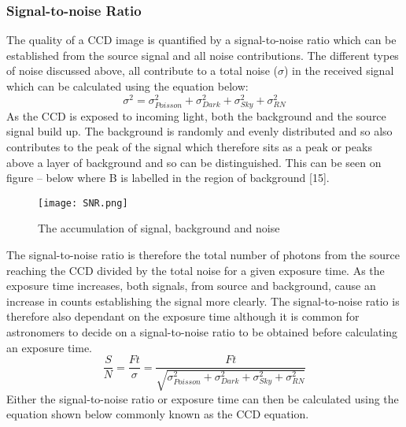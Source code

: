\documentclass[pdf,color]{UoBnote}
\begin{document}
\subsubsection{Signal-to-noise Ratio}
The quality of a CCD image is quantified by a signal-to-noise ratio which can be established from the source signal and all noise contributions. The different types of noise discussed above, all contribute to a total noise ($\sigma$) in the received signal which can be calculated using the equation below:\\
\begin{equation}
\sigma^{2} = \sigma_{Poisson}^{2} + \sigma_{Dark}^{2} + \sigma_{Sky}^{2} + \sigma_{RN}^{2}
\end{equation}
\newline
 As the CCD is exposed to incoming light, both the background and the source signal build up. The background is randomly and evenly distributed and so also contributes to the peak of the signal which therefore sits as a peak or peaks above a layer of background and so can be distinguished. This can be seen on figure – below where B is labelled in the region of background [15]. \\
\newline
\begin{figure}[H]
\begin{center}
\texttt{[image: SNR.png]}
\end{center}
\caption{The accumulation of signal, background and noise}\label{fig:figure1}
\end{figure}
\noindent
\newline
The signal-to-noise ratio is therefore the total number of photons from the source reaching the CCD divided by the total noise for a given exposure time. As the exposure time increases, both signals, from source and background, cause an increase in counts establishing the signal more clearly. The signal-to-noise ratio is therefore also dependant on the exposure time although it is common for astronomers to decide on a signal-to-noise ratio to be obtained before calculating an exposure time.\\
\begin{equation}
\frac{S}{N} = \frac{Ft}{\sigma} =\frac{Ft}{\sqrt{\sigma_{Poisson}^{2} + \sigma_{Dark}^{2} + \sigma_{Sky}^{2} + \sigma_{RN}^{2}}}
\end{equation}
\newline
Either the signal-to-noise ratio or exposure time can then be calculated using the equation shown below commonly known as the CCD equation.\\
\end{document}
